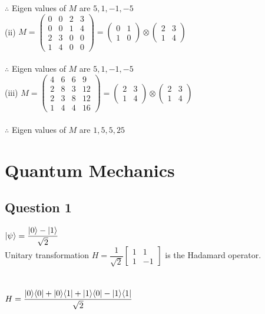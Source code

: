 \documentclass{article}
\DeclarePairedDelimiter\bra{\langle}{\rvert}
\DeclarePairedDelimiter\ket{\lvert}{\rangle}
\begin{document}
\noindent
$\therefore$ Eigen values of $M$ are $5,1,-1,-5$\\

\noindent
(ii) $M = \begin{pmatrix}
    0 & 0 & 2 & 3\\
    0 & 0 & 1 & 4\\
    2 & 3 & 0 & 0\\
    1 & 4 & 0 & 0
\end{pmatrix} = \begin{pmatrix} 0 & 1\\ 1 & 0 \end{pmatrix} \otimes \begin{pmatrix} 2 & 3\\ 1 & 4 \end{pmatrix}$\\\\

\noindent
$\therefore$ Eigen values of $M$ are $5,1,-1,-5$\\

\noindent
(iii) $M = \begin{pmatrix}
    4 & 6 & 6 & 9\\
    2 & 8 & 3 & 12\\
    2 & 3 & 8 & 12\\
    1 & 4 & 4 & 16
\end{pmatrix} = \begin{pmatrix} 2 & 3\\ 1 & 4 \end{pmatrix} \otimes \begin{pmatrix} 2 & 3\\ 1 & 4 \end{pmatrix}$\\\\

\noindent
$\therefore$ Eigen values of $M$ are $1,5,5,25$\\

\section{Quantum Mechanics}
\subsection{Question 1}

$\ket{\psi} = \dfrac{\ket{0}-\ket{1}}{\sqrt{2}}$\\

\noindent
Unitary transformation $H = \dfrac{1}{\sqrt{2}} \begin{bmatrix} 1 & 1\\ 1 & -1 \end{bmatrix}$ is the Hadamard operator.\\\\\\
\noindent
$H = \dfrac{\ket{0}\bra{0}+ \ket{0}\bra{1}+\ket{1}\bra{0} - \ket{1}\bra{1}}{\sqrt{2}} $\\\\
\end{document}
